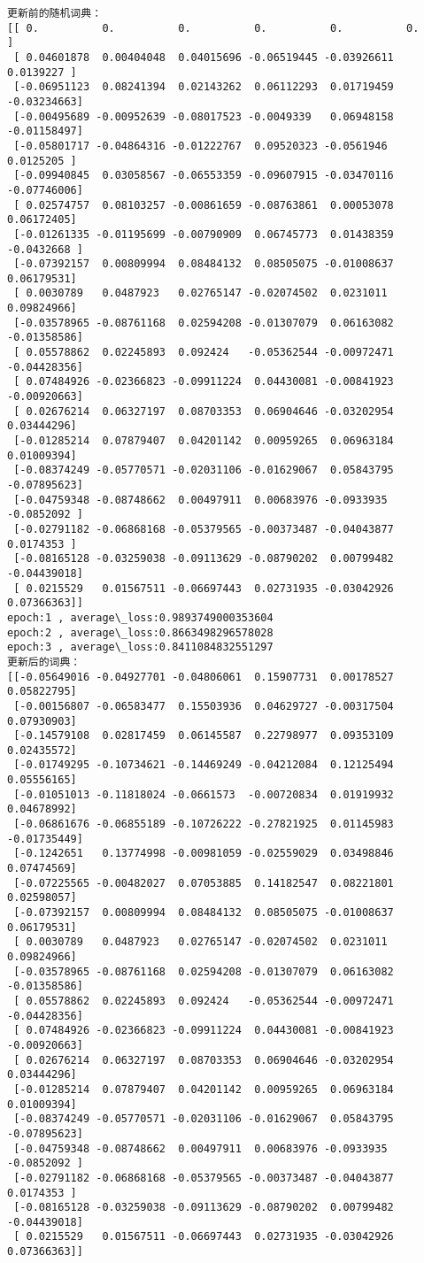 \documentclass[11pt]{ctexart}
\begin{document}
    \begin{Verbatim}[commandchars=\\\{\}]
更新前的随机词典：
[[ 0.          0.          0.          0.          0.          0.        ]
 [ 0.04601878  0.00404048  0.04015696 -0.06519445 -0.03926611  0.0139227 ]
 [-0.06951123  0.08241394  0.02143262  0.06112293  0.01719459 -0.03234663]
 [-0.00495689 -0.00952639 -0.08017523 -0.0049339   0.06948158 -0.01158497]
 [-0.05801717 -0.04864316 -0.01222767  0.09520323 -0.0561946   0.0125205 ]
 [-0.09940845  0.03058567 -0.06553359 -0.09607915 -0.03470116 -0.07746006]
 [ 0.02574757  0.08103257 -0.00861659 -0.08763861  0.00053078  0.06172405]
 [-0.01261335 -0.01195699 -0.00790909  0.06745773  0.01438359 -0.0432668 ]
 [-0.07392157  0.00809994  0.08484132  0.08505075 -0.01008637  0.06179531]
 [ 0.0030789   0.0487923   0.02765147 -0.02074502  0.0231011   0.09824966]
 [-0.03578965 -0.08761168  0.02594208 -0.01307079  0.06163082 -0.01358586]
 [ 0.05578862  0.02245893  0.092424   -0.05362544 -0.00972471 -0.04428356]
 [ 0.07484926 -0.02366823 -0.09911224  0.04430081 -0.00841923 -0.00920663]
 [ 0.02676214  0.06327197  0.08703353  0.06904646 -0.03202954  0.03444296]
 [-0.01285214  0.07879407  0.04201142  0.00959265  0.06963184  0.01009394]
 [-0.08374249 -0.05770571 -0.02031106 -0.01629067  0.05843795 -0.07895623]
 [-0.04759348 -0.08748662  0.00497911  0.00683976 -0.0933935  -0.0852092 ]
 [-0.02791182 -0.06868168 -0.05379565 -0.00373487 -0.04043877  0.0174353 ]
 [-0.08165128 -0.03259038 -0.09113629 -0.08790202  0.00799482 -0.04439018]
 [ 0.0215529   0.01567511 -0.06697443  0.02731935 -0.03042926  0.07366363]]
epoch:1 , average\_loss:0.9893749000353604
epoch:2 , average\_loss:0.8663498296578028
epoch:3 , average\_loss:0.8411084832551297
更新后的词典：
[[-0.05649016 -0.04927701 -0.04806061  0.15907731  0.00178527  0.05822795]
 [-0.00156807 -0.06583477  0.15503936  0.04629727 -0.00317504  0.07930903]
 [-0.14579108  0.02817459  0.06145587  0.22798977  0.09353109  0.02435572]
 [-0.01749295 -0.10734621 -0.14469249 -0.04212084  0.12125494  0.05556165]
 [-0.01051013 -0.11818024 -0.0661573  -0.00720834  0.01919932  0.04678992]
 [-0.06861676 -0.06855189 -0.10726222 -0.27821925  0.01145983 -0.01735449]
 [-0.1242651   0.13774998 -0.00981059 -0.02559029  0.03498846  0.07474569]
 [-0.07225565 -0.00482027  0.07053885  0.14182547  0.08221801  0.02598057]
 [-0.07392157  0.00809994  0.08484132  0.08505075 -0.01008637  0.06179531]
 [ 0.0030789   0.0487923   0.02765147 -0.02074502  0.0231011   0.09824966]
 [-0.03578965 -0.08761168  0.02594208 -0.01307079  0.06163082 -0.01358586]
 [ 0.05578862  0.02245893  0.092424   -0.05362544 -0.00972471 -0.04428356]
 [ 0.07484926 -0.02366823 -0.09911224  0.04430081 -0.00841923 -0.00920663]
 [ 0.02676214  0.06327197  0.08703353  0.06904646 -0.03202954  0.03444296]
 [-0.01285214  0.07879407  0.04201142  0.00959265  0.06963184  0.01009394]
 [-0.08374249 -0.05770571 -0.02031106 -0.01629067  0.05843795 -0.07895623]
 [-0.04759348 -0.08748662  0.00497911  0.00683976 -0.0933935  -0.0852092 ]
 [-0.02791182 -0.06868168 -0.05379565 -0.00373487 -0.04043877  0.0174353 ]
 [-0.08165128 -0.03259038 -0.09113629 -0.08790202  0.00799482 -0.04439018]
 [ 0.0215529   0.01567511 -0.06697443  0.02731935 -0.03042926  0.07366363]]
    \end{Verbatim}


    
    
    
\end{document}
